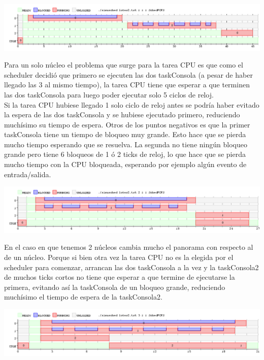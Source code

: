 \begin{center}
\includegraphics[scale=0.4]{graficos/imagen1.png}
\end{center}

Para un solo núcleo el problema que surge para la tarea CPU es que como el scheduler decidió que primero se ejecuten las dos taskConsola (a pesar de haber llegado las 3 al mismo tiempo), la tarea CPU tiene que esperar a que terminen las dos taskConsola para luego poder ejecutar solo 5 ciclos de reloj. \\

Si la tarea CPU hubiese llegado 1 solo ciclo de reloj antes se podría haber evitado la espera de las dos taskConsola y se hubiese ejecutado primero, reduciendo muchísimo su tiempo de espera. 
Otros de los puntos negativos es que la primer taskConsola tiene un tiempo de bloqueo muy grande. Esto hace que se pierda mucho tiempo esperando que se resuelva. La segunda no tiene ning\'un bloqueo grande pero tiene 6 bloqueos de 1 \'o 2 ticks de reloj, lo que hace que se pierda mucho tiempo con la CPU bloqueada, esperando por ejemplo algún evento de entrada/salida. \\

\begin{center}
\includegraphics[scale=0.4]{graficos/imagen2.png}
\end{center}

En el caso en que tenemos 2 núcleos cambia mucho el panorama con respecto al de un núcleo.
Porque si bien otra vez la tarea CPU no es la elegida por el scheduler para comenzar, arrancan las dos taskConsola a la vez y la taskConsola2 de muchos ticks cortos no tiene que esperar a que termine de ejecutarse la primera, evitando así la taskConsola de un bloqueo grande, reduciendo muchísimo el tiempo de espera de la taskConsola2.\\

\begin{center}
\includegraphics[scale=0.4]{graficos/imagen3.png}
\end{center}

